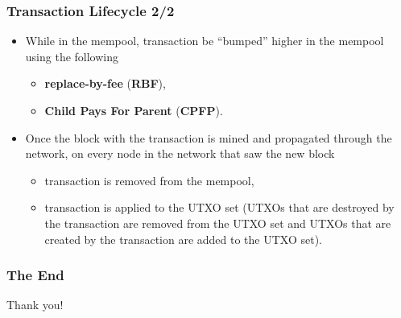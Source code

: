 \documentclass{beamer}
\begin{document}
\begin{frame}
  \frametitle{Transaction Lifecycle 2/2}
  \begin{itemize}
  \item While in the mempool, transaction be ``bumped'' higher in the mempool
    using the following
    \begin{itemize}
    \item \textbf{replace-by-fee} (\textbf{RBF}),
    \item \textbf{Child Pays For Parent} (\textbf{CPFP}).
    \end{itemize}
  \item Once the block with the transaction is mined and propagated through the
    network, on every node in the network that saw the new block
    \begin{itemize}
    \item transaction is removed from the mempool,
    \item transaction is applied to the UTXO set (UTXOs that are destroyed by
      the transaction are removed from the UTXO set and UTXOs that are created
      by the transaction are added to the UTXO set).
    \end{itemize}
  \end{itemize}
\end{frame}

\begin{frame}
  \frametitle{The End}
  \begin{center}
    Thank you!
  \end{center}
\end{frame}
\end{document}
